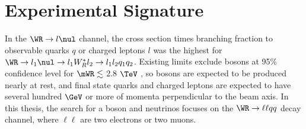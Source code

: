 \section{Experimental Signature}
\label{sec:lrsExpSignature}
In the $\WR \rightarrow l\nul$ channel, the cross section times branching fraction to observable quarks 
$q$ or charged leptons $l$ was the highest for $\WR \rightarrow l_{1}\nul \rightarrow l_{1}W^{*}_{R}l_{2} \rightarrow l_{1}l_{2}q_{1}q_{2}$.  
Existing limits exclude \WR bosons at 95\% confidence level for $\mWR \lesssim$ 2.8 $\TeV$ \cite{cmsWRRunOneResults}, 
so \WR bosons are expected to be produced nearly at rest, and final state quarks and charged leptons are 
expected to have several hundred $\GeV$ or more of momenta perpendicular to the beam axis.  In this 
thesis, the search for a \WR boson and \nul neutrinos focuses on the $\WR \rightarrow \ell\ell qq$ decay 
channel, where $\ell\ell$ are two electrons or two muons.


